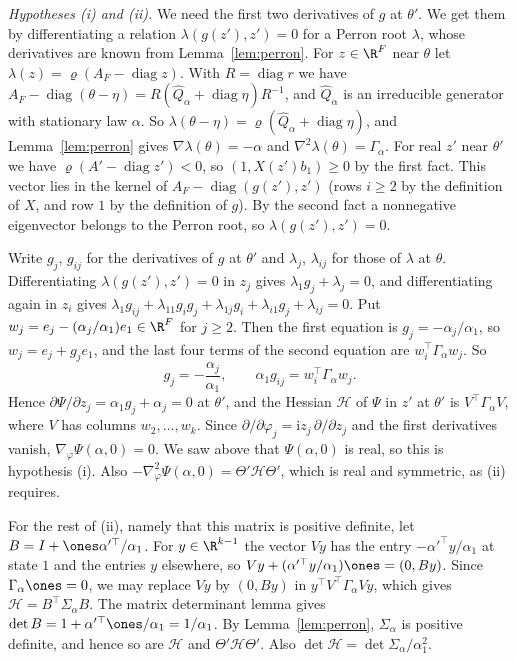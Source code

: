 \emph{Hypotheses \textup{(i)} and \textup{(ii)}.} We need the first two
derivatives of $g$ at $\theta'$. We get them by differentiating a relation
$\lambda(g(z'),z')=0$ for a Perron root $\lambda$, whose derivatives are
known from Lemma~\ref{lem:perron}. For $z\in\R^F$ near $\theta$ let
$\lambda(z)=\varrho(A_F-\operatorname{diag}z)$. With $R=\operatorname{diag}r$
we have $A_F-\operatorname{diag}(\theta-\eta)=R(\widehat
Q_\alpha+\operatorname{diag}\eta)R^{-1}$, and $\widehat Q_\alpha$ is an
irreducible generator with stationary law $\alpha$. So
$\lambda(\theta-\eta)=\varrho(\widehat Q_\alpha+\operatorname{diag}\eta)$, and
Lemma~\ref{lem:perron} gives $\nabla\lambda(\theta)=-\alpha$ and
$\nabla^2\lambda(\theta)=\Gamma_\alpha$. For real $z'$ near $\theta'$ we have
$\varrho(A'-\operatorname{diag}z')<0$, so $(1,X(z')b_1)\ge0$ by the first
fact. This vector lies in the kernel of $A_F-\operatorname{diag}(g(z'),z')$
(rows $i\ge2$ by the definition of $X$, and row $1$ by the definition of
$g$). By the second fact a nonnegative eigenvector belongs to the Perron
root, so $\lambda(g(z'),z')=0$.

Write $g_j$, $g_{ij}$ for the derivatives of $g$ at $\theta'$ and
$\lambda_j$, $\lambda_{ij}$ for those of $\lambda$ at $\theta$.
Differentiating $\lambda(g(z'),z')=0$ in $z_j$ gives
$\lambda_1g_j+\lambda_j=0$, and differentiating again in $z_i$ gives
$\lambda_1g_{ij}+\lambda_{11}g_ig_j+\lambda_{1j}g_i+\lambda_{i1}g_j
+\lambda_{ij}=0$. Put $w_j=e_j-(\alpha_j/\alpha_1)e_1\in\R^F$ for $j\ge2$.
Then the first equation is $g_j=-\alpha_j/\alpha_1$, so $w_j=e_j+g_je_1$,
and the last four terms of the second equation are
$w_i^\top\Gamma_\alpha w_j$. So
\[
g_j=-\frac{\alpha_j}{\alpha_1},\qquad \alpha_1g_{ij}=w_i^\top\Gamma_\alpha w_j .
\]
Hence $\partial\Psi/\partial z_j=\alpha_1g_j+\alpha_j=0$ at $\theta'$, and the
Hessian $\mathcal H$ of $\Psi$ in $z'$ at $\theta'$ is $V^\top\Gamma_\alpha V$,
where $V$ has columns $w_2,\dots,w_k$. Since
$\partial/\partial\varphi_j=\mathrm iz_j\,\partial/\partial z_j$ and the first
derivatives vanish, $\nabla_\varphi\Psi(\alpha,0)=0$. We saw above that
$\Psi(\alpha,0)$ is real, so this is hypothesis (i). Also
$-\nabla^2_\varphi\Psi(\alpha,0)=\Theta'\mathcal H\Theta'$, which is real and
symmetric, as (ii) requires.

For the rest of (ii), namely that this matrix is positive definite, let $B=I+\ones\alpha'^\top/\alpha_1$. For $y\in\R^{k-1}$ the vector
$Vy$ has the entry $-\alpha'^\top y/\alpha_1$ at state $1$ and the entries
$y$ elsewhere, so $Vy+(\alpha'^\top y/\alpha_1)\ones=(0,By)$. Since
$\Gamma_\alpha\ones=0$, we may replace $Vy$ by $(0,By)$ in
$y^\top V^\top\Gamma_\alpha Vy$, which gives
$\mathcal H=B^\top\Sigma_\alpha B$. The matrix determinant lemma gives
$\det B=1+\alpha'^\top\ones/\alpha_1=1/\alpha_1$. By Lemma~\ref{lem:perron},
$\Sigma_\alpha$ is positive definite, and hence so are $\mathcal H$ and
$\Theta'\mathcal H\Theta'$. Also
$\det\mathcal H=\det\Sigma_\alpha/\alpha_1^2$.

